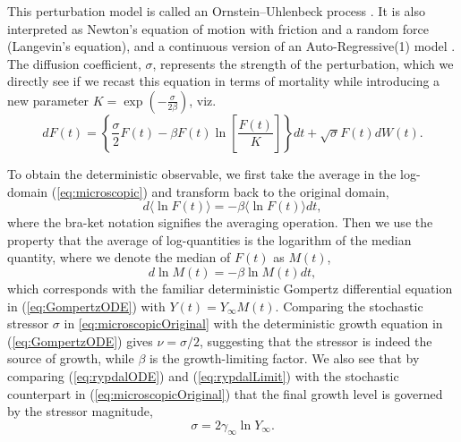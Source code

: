 \documentclass{article}
\begin{document}
This perturbation model is called an Ornstein–Uhlenbeck process \citep{risken1996fokker}. It is also interpreted as Newton's equation of motion with friction and a random force (Langevin's equation), and a continuous version of an Auto-Regressive(1) model \citep{akaike1970statistical}. The diffusion coefficient, $\sigma$, represents the strength of the perturbation, which we directly see if we recast this equation in terms of mortality while introducing a new parameter $K=\exp{(-\frac{\sigma}{2\beta})}$, viz. 
\begin{equation}
\label{eq:microscopicOriginal}
dF(t) = \left\{\frac{\sigma}{2}F(t) - \beta F(t)\ln\left[\frac{F(t)}{K}\right]\right\}dt + \sqrt{\sigma}F(t)dW(t).
\end{equation}



To obtain the deterministic observable, we first take the average in the log-domain (\ref{eq:microscopic}) and transform back to the original domain, 
\begin{equation}
d\langle\ln{F(t)}\rangle = -\beta \langle\ln{F(t)}\rangle dt,
\end{equation}
where the bra-ket notation signifies the averaging operation.
Then we use the property that the average of log-quantities is the logarithm of the median quantity, where we denote the median of $F(t)$ as $M(t)$, 
\begin{equation}
\label{eq:medianGomp}
d\ln{M(t)} = -\beta \ln{M(t)} dt,
\end{equation}
which corresponds with the familiar deterministic Gompertz differential equation in (\ref{eq:GompertzODE}) with $Y(t) = Y_\infty M(t)$. 
Comparing the stochastic stressor $\sigma$ in \ref{eq:microscopicOriginal} with the deterministic growth equation in (\ref{eq:GompertzODE}) gives $\nu=\sigma/2$, suggesting that the stressor is indeed the source of growth, while $\beta$ is the growth-limiting factor. 
We also see that by comparing (\ref{eq:rypdalODE}) and (\ref{eq:rypdalLimit}) with the stochastic counterpart in (\ref{eq:microscopicOriginal}) that the final growth level is governed by the stressor magnitude,
\begin{equation}
\sigma = 2\gamma_{\infty}\ln{Y_{\infty}}.
\end{equation}
\end{document}
